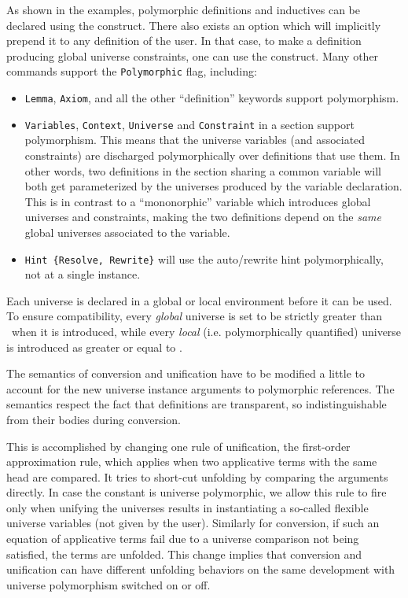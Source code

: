 As shown in the examples, polymorphic definitions and inductives can be
declared using the  construct. There also exists an
option  which will implicitly prepend
it to any definition of the user. In that case, to make a definition
producing global universe constraints, one can use the
 construct. Many other commands support the
\texttt{Polymorphic} flag, including:

\begin{itemize}
\item \texttt{Lemma}, \texttt{Axiom}, and all the other ``definition''
  keywords support polymorphism.
\item \texttt{Variables}, \texttt{Context}, \texttt{Universe} and
  \texttt{Constraint} in a section support polymorphism.  This means
  that the universe variables (and associated constraints) are
  discharged polymorphically over definitions that use them. In other
  words, two definitions in the section sharing a common variable will
  both get parameterized by the universes produced by the variable
  declaration. This is in contrast to a ``mononorphic'' variable which
  introduces global universes and constraints, making the two
  definitions depend on the \emph{same} global universes associated to
  the variable.
\item \texttt{Hint \{Resolve, Rewrite\}} will use the auto/rewrite hint
  polymorphically, not at a single instance.
\end{itemize}


Each universe is declared in a global or local environment before it can
be used. To ensure compatibility, every \emph{global} universe is set to
be strictly greater than \Set~when it is introduced, while every
\emph{local} (i.e. polymorphically quantified) universe is introduced as
greater or equal to \Set.


The semantics of conversion and unification have to be modified a little
to account for the new universe instance arguments to polymorphic
references. The semantics respect the fact that definitions are
transparent, so indistinguishable from their bodies during conversion.

This is accomplished by changing one rule of unification, the
first-order approximation rule, which applies when two applicative terms
with the same head are compared. It tries to short-cut unfolding by
comparing the arguments directly. In case the constant is universe
polymorphic, we allow this rule to fire only when unifying the universes
results in instantiating a so-called flexible universe variables (not
given by the user). Similarly for conversion, if such an equation of
applicative terms fail due to a universe comparison not being satisfied,
the terms are unfolded. This change implies that conversion and
unification can have different unfolding behaviors on the same
development with universe polymorphism switched on or off.

